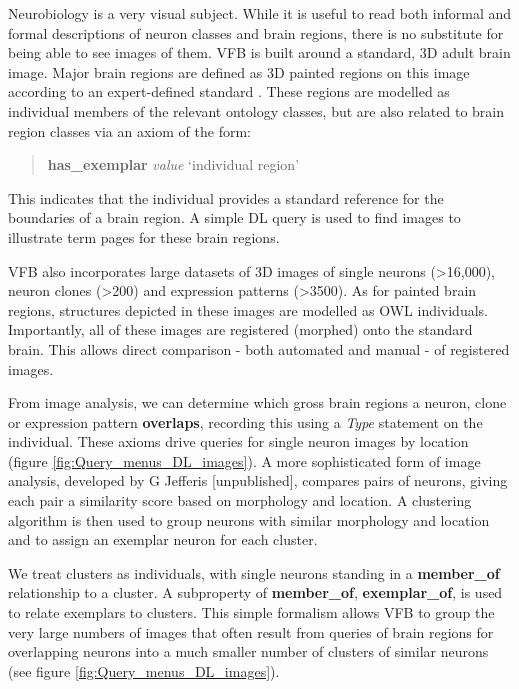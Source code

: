 \documentclass[runningheads,a4paper]{llncs}
\begin{document}
Neurobiology is a very visual subject.  While it is useful to read
both informal and formal descriptions of neuron classes and brain
regions, there is no substitute for being able to see images of them.
VFB is built around a standard, 3D adult brain image.  Major brain
regions are defined as 3D painted regions on this image according to
an expert-defined standard \cite{pmid24559671}.  These regions are modelled as
individual members of the relevant ontology classes, but are also
related to brain region classes via an axiom of the form:

\begin{quote}
\textbf{has\_exemplar} \textit{value} `individual region'
\end{quote}

This indicates that the individual provides a standard reference for
the boundaries of a brain region.  A simple DL query is used to find
images to illustrate term pages for these brain regions.

VFB also incorporates large datasets of 3D images of single neurons
(\textgreater 16,000), neuron clones (\textgreater 200) and expression
patterns (\textgreater 3500). As for painted brain regions, structures
depicted in these images are modelled as OWL individuals.
Importantly, all of these images are registered (morphed) onto the
standard brain. This allows direct comparison - both automated and
manual  - of registered images.

From image analysis, we can determine which gross brain regions a
neuron, clone or expression pattern \textbf{overlaps}, recording this
using a \textit{Type} statement on the individual.  These axioms drive queries for
single neuron images by location (figure
\ref{fig:Query_menus_DL_images}). A more sophisticated form of image
analysis, developed by G Jefferis [unpublished], compares pairs of
neurons,  giving each pair a similarity score based on morphology
and location.  A clustering algorithm is then used to group neurons with
similar morphology and location and to assign an exemplar neuron for
each cluster.

We treat clusters as individuals, with single neurons standing in a
\textbf{member\_of} relationship to a cluster.  A subproperty of
\textbf{member\_of}, \textbf{exemplar\_of}, is used to relate
exemplars to clusters.  This simple formalism allows VFB to group the
very large numbers of images that often result from queries of brain
regions for overlapping neurons into a much smaller number of clusters
of similar neurons (see figure \ref{fig:Query_menus_DL_images}).
\end{document}
